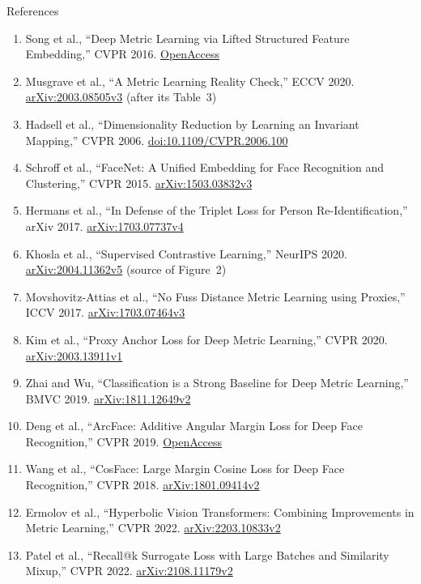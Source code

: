 \begin{frame}[allowframebreaks]{References}
\begin{enumerate}
    \item Song et al., ``Deep Metric Learning via Lifted Structured Feature Embedding,'' CVPR 2016. \href{https://openaccess.thecvf.com/content_cvpr_2016/papers/Song_Deep_Metric_Learning_CVPR_2016_paper.pdf}{OpenAccess}
    \item Musgrave et al., ``A Metric Learning Reality Check,'' ECCV 2020. \href{https://arxiv.org/abs/2003.08505v3}{arXiv:2003.08505v3} (after its Table~3)
    \item Hadsell et al., ``Dimensionality Reduction by Learning an Invariant Mapping,'' CVPR 2006. \href{https://doi.org/10.1109/CVPR.2006.100}{doi:10.1109/CVPR.2006.100}
    \item Schroff et al., ``FaceNet: A Unified Embedding for Face Recognition and Clustering,'' CVPR 2015. \href{https://arxiv.org/abs/1503.03832v3}{arXiv:1503.03832v3}
    \item Hermans et al., ``In Defense of the Triplet Loss for Person Re-Identification,'' arXiv 2017. \href{https://arxiv.org/abs/1703.07737v4}{arXiv:1703.07737v4}
    \item Khosla et al., ``Supervised Contrastive Learning,'' NeurIPS 2020. \href{https://arxiv.org/abs/2004.11362v5}{arXiv:2004.11362v5} (source of Figure~2)
    \item Movshovitz-Attias et al., ``No Fuss Distance Metric Learning using Proxies,'' ICCV 2017. \href{https://arxiv.org/abs/1703.07464v3}{arXiv:1703.07464v3}
    \item Kim et al., ``Proxy Anchor Loss for Deep Metric Learning,'' CVPR 2020. \href{https://arxiv.org/abs/2003.13911v1}{arXiv:2003.13911v1}
    \item Zhai and Wu, ``Classification is a Strong Baseline for Deep Metric Learning,'' BMVC 2019. \href{https://arxiv.org/abs/1811.12649v2}{arXiv:1811.12649v2}
    \item Deng et al., ``ArcFace: Additive Angular Margin Loss for Deep Face Recognition,'' CVPR 2019. \href{https://openaccess.thecvf.com/content_CVPR_2019/papers/Deng_ArcFace_Additive_Angular_Margin_Loss_for_Deep_Face_Recognition_CVPR_2019_paper.pdf}{OpenAccess}
    \item Wang et al., ``CosFace: Large Margin Cosine Loss for Deep Face Recognition,'' CVPR 2018. \href{https://arxiv.org/abs/1801.09414v2}{arXiv:1801.09414v2}
    \item Ermolov et al., ``Hyperbolic Vision Transformers: Combining Improvements in Metric Learning,'' CVPR 2022. \href{https://arxiv.org/abs/2203.10833v2}{arXiv:2203.10833v2}
    \item Patel et al., ``Recall@k Surrogate Loss with Large Batches and Similarity Mixup,'' CVPR 2022. \href{https://arxiv.org/abs/2108.11179v2}{arXiv:2108.11179v2}

\end{enumerate}
\end{frame}
